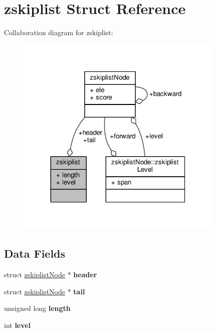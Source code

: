 \hypertarget{structzskiplist}{}\section{zskiplist Struct Reference}
\label{structzskiplist}


Collaboration diagram for zskiplist\+:\nopagebreak
\begin{figure}[H]
\begin{center}
\leavevmode
\includegraphics[width=281pt]{structzskiplist__coll__graph}
\end{center}
\end{figure}
\subsection*{Data Fields}
\begin{DoxyCompactItemize}
\item 
\mbox{\label{structzskiplist_ac8474a834420b5a7625ba9bf51030af2}} 
struct \hyperlink{structzskiplistNode}{zskiplist\+Node} $\ast$ {\bfseries header}
\item 
\mbox{\label{structzskiplist_a509b215efb685501673262b8dfc6f520}} 
struct \hyperlink{structzskiplistNode}{zskiplist\+Node} $\ast$ {\bfseries tail}
\item 
\mbox{\label{structzskiplist_aa93a7ff84a3165a1956bc9d4c58fe51b}} 
unsigned long {\bfseries length}
\item 
\mbox{\label{structzskiplist_a98e54430e6d11f83dbcd48d41dfa0a5a}} 
int {\bfseries level}
\end{DoxyCompactItemize}


